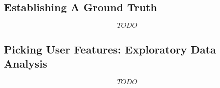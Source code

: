 \subsection{Establishing A Ground Truth} %
\label{sub:establishing_a_ground_truth}

\[ TODO \]


\subsection{Picking User Features: Exploratory Data Analysis} %
\label{sub:picking_user_features}

\[ TODO \]



